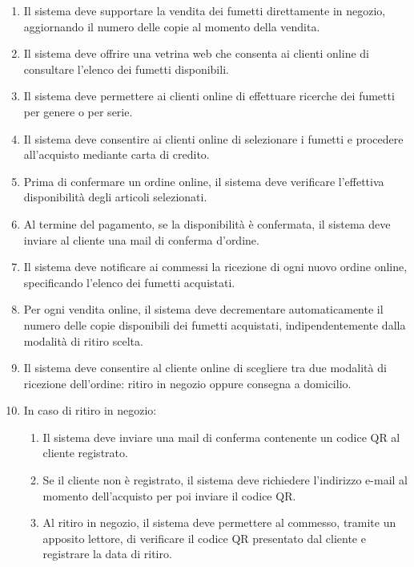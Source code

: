 \documentclass[12pt, a4paper]{article}
\begin{document}
\begin{enumerate}
\item Il sistema deve supportare la vendita dei fumetti direttamente in negozio, aggiornando il numero delle copie al momento della vendita.

\item Il sistema deve offrire una vetrina web che consenta ai clienti online di consultare l’elenco dei fumetti disponibili.

\item Il sistema deve permettere ai clienti online di effettuare ricerche dei fumetti per genere o per serie.

\item Il sistema deve consentire ai clienti online di selezionare i fumetti e procedere all’acquisto mediante carta di credito.

\item Prima di confermare un ordine online, il sistema deve verificare l’effettiva disponibilità degli articoli selezionati.

\item Al termine del pagamento, se la disponibilità è confermata, il sistema deve inviare al cliente una mail di conferma d’ordine.

\item Il sistema deve notificare ai commessi la ricezione di ogni nuovo ordine online, specificando l’elenco dei fumetti acquistati.

\item Per ogni vendita online, il sistema deve decrementare automaticamente il numero delle copie disponibili dei fumetti acquistati, indipendentemente dalla modalità di ritiro scelta.

\item Il sistema deve consentire al cliente online di scegliere tra due modalità di ricezione dell’ordine: ritiro in negozio oppure consegna a domicilio.

\item In caso di ritiro in negozio:
  \begin{enumerate}
    \item Il sistema deve inviare una mail di conferma contenente un codice QR al cliente registrato.
    \item Se il cliente non è registrato, il sistema deve richiedere l’indirizzo e-mail al momento dell’acquisto per poi inviare il codice QR.
    \item Al ritiro in negozio, il sistema deve permettere al commesso, tramite un apposito lettore, di verificare il codice QR presentato dal cliente e registrare la data di ritiro.
  \end{enumerate}


\end{enumerate}
\end{document}
